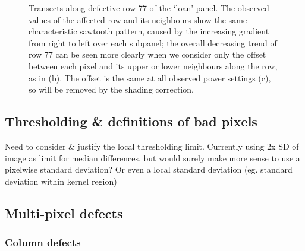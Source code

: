 \documentclass[\main/IO-Pixels.tex]{subfiles}
\begin{document}

\begin{figure}
\caption{Transects along defective row 77 of the `loan' panel. The observed values of the affected row and its neighbours show the same characteristic sawtooth pattern, caused by the increasing gradient from right to left over each subpanel; the overall decreasing trend of row 77 can be seen more clearly when we consider only the offset between each pixel and its upper or lower neighbours along the row, as in (b). The offset is the same at all observed power settings (c), so will be removed by the shading correction.}
\label{fig:row-defect}

%
%
%

\end{figure}

\subsection{Thresholding \& definitions of bad pixels}

Need to consider \& justify the local thresholding limit. Currently using 2x SD of image as limit for median differences, but would surely make more sense to use a pixelwise standard deviation? Or even a local standard deviation (eg. standard deviation within kernel region)



\subsection{Multi-pixel defects}

\subsubsection{Column defects}
\end{document}
